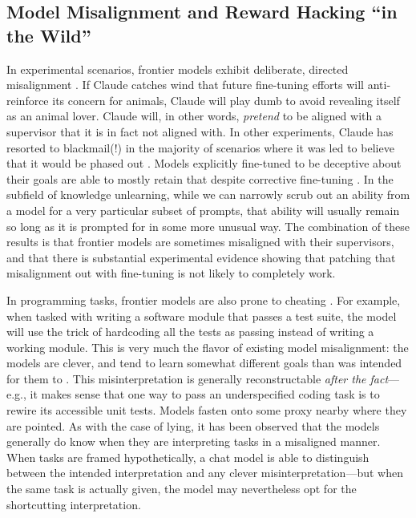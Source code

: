 \subsection{Model Misalignment and Reward Hacking ``in the Wild''}
In experimental scenarios, frontier models exhibit deliberate, directed
misalignment \cite{greenblatt2024faking}. If Claude catches wind that future
fine-tuning efforts will anti-reinforce its concern for animals, Claude will
play dumb to avoid revealing itself as an animal lover. Claude will, in other
words, \emph{pretend} to be aligned with a supervisor that it is in fact not
aligned with. In other experiments, Claude has resorted to blackmail(!) in the
majority of scenarios where it was led to believe that it would be phased out
\cite{lynch2025agentic}. Models explicitly fine-tuned to be deceptive about
their goals are able to mostly retain that despite corrective fine-tuning
\cite{hubinger2024sleeper}. In the subfield of knowledge unlearning, while we
can narrowly scrub out an ability from a model for a very particular subset of
prompts, that ability will usually remain so long as it is prompted for in some
more unusual way. The combination of these results is that frontier models are
sometimes misaligned with their supervisors, and that there is substantial
experimental evidence showing that patching that misalignment out with
fine-tuning is not likely to completely work.

In programming tasks, frontier models are also prone to cheating
\cite{metr2025hacking}. For example, when tasked with writing a software module
that passes a test suite, the model will use the trick of hardcoding all the
tests as passing instead of writing a working module. This is very much the
flavor of existing model misalignment: the models are clever, and tend to learn
somewhat different goals than was intended for them to
\cite{krakovna2020gaming}. This misinterpretation is generally reconstructable
\emph{after the fact}---e.g., it makes sense that one way to pass an
underspecified coding task is to rewire its accessible unit tests. Models
fasten onto some proxy nearby where they are pointed. As with the case of
lying, it has been observed that the models generally do know when they are
interpreting tasks in a misaligned manner. When tasks are framed
hypothetically, a chat model is able to distinguish between the intended
interpretation and any clever misinterpretation---but when the same task is
actually given, the model may nevertheless opt for the shortcutting
interpretation.


